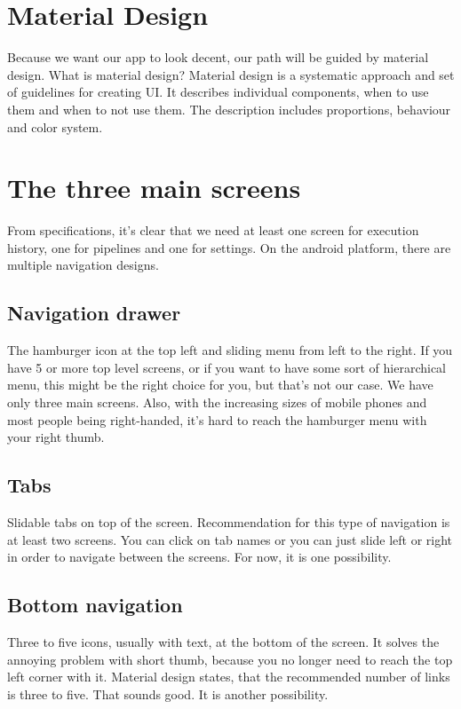 \section{Material Design}
Because we want our app to look decent, our path will be guided by material design.
What is material design?
Material design is a systematic approach and set of guidelines for creating UI.
It describes individual components, when to use them and when to not use them.
The description includes proportions, behaviour and color system.

\section{The three main screens}
From specifications, it's clear that we need at least one screen for execution history, one for pipelines and one for settings.
On the android platform, there are multiple navigation designs.

\subsection{Navigation drawer}
The hamburger icon at the top left and sliding menu from left to the right.
If you have 5 or more top level screens, or if you want to have some sort of hierarchical menu, this might be the right choice for you, but that's not our case. We have only three main screens.
Also, with the increasing sizes of mobile phones and most people being right-handed, it's hard to reach the hamburger menu with your right thumb.

\subsection{Tabs}
Slidable tabs on top of the screen.
Recommendation for this type of navigation is at least two screens.
You can click on tab names or you can just slide left or right in order to navigate between the screens.
For now, it is one possibility.

\subsection{Bottom navigation}
Three to five icons, usually with text, at the bottom of the screen.
It solves the annoying problem with short thumb, because you no longer need to reach the top left corner with it.
Material design states, that the recommended number of links is three to five. That sounds good.
It is another possibility.

